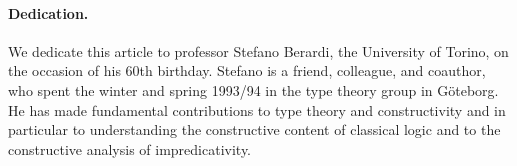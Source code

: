 \documentclass[11pt,a4paper]{article}
\theoremstyle{plain}
\theoremstyle{definition}
\def\CwF{\mathrm{CwF}}
\def\Sigmaext{{\Sigma^\mathrm{ext}}}
\def\Sigmaint{{\Sigma^\mathrm{up}}}
\def\TText{{\mathbf{TT}^\mathrm{ext}}}
\def\TTint{{\mathbf{TT}^\mathrm{up}}}
\begin{document}
%
%
%
\paragraph{Dedication.} We dedicate this article to professor Stefano Berardi, the University of Torino, on the occasion of his 60th birthday. Stefano is a friend, colleague, and coauthor, who spent the winter and spring 1993/94 in the type theory group in Göteborg. He has made fundamental contributions to type theory and constructivity and in particular to understanding the constructive content of classical logic and to the constructive analysis of impredicativity.
\end{document}
